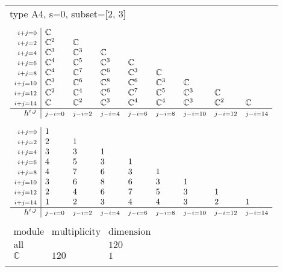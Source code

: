 \documentclass[crop,border=2mm]{standalone}
\begin{document}
\begin{tabular}{l}
{\huge type A4, s=0, subset=[2, 3]}\\ \\


$\displaystyle
\begin{array}{r|l l l l l l l l}
	{\scriptstyle i+j=0}&\mathbb{C}&&&&&&&\\
	{\scriptstyle i+j=2}&\mathbb{C}^{2}&\mathbb{C}&&&&&&\\
	{\scriptstyle i+j=4}&\mathbb{C}^{3}&\mathbb{C}^{3}&\mathbb{C}&&&&&\\
	{\scriptstyle i+j=6}&\mathbb{C}^{4}&\mathbb{C}^{5}&\mathbb{C}^{3}&\mathbb{C}&&&&\\
	{\scriptstyle i+j=8}&\mathbb{C}^{4}&\mathbb{C}^{7}&\mathbb{C}^{6}&\mathbb{C}^{3}&\mathbb{C}&&&\\
	{\scriptstyle i+j=10}&\mathbb{C}^{3}&\mathbb{C}^{6}&\mathbb{C}^{8}&\mathbb{C}^{6}&\mathbb{C}^{3}&\mathbb{C}&&\\
	{\scriptstyle i+j=12}&\mathbb{C}^{2}&\mathbb{C}^{4}&\mathbb{C}^{6}&\mathbb{C}^{7}&\mathbb{C}^{5}&\mathbb{C}^{3}&\mathbb{C}&\\
	{\scriptstyle i+j=14}&\mathbb{C}&\mathbb{C}^{2}&\mathbb{C}^{3}&\mathbb{C}^{4}&\mathbb{C}^{4}&\mathbb{C}^{3}&\mathbb{C}^{2}&\mathbb{C}\\
	\hline h^{i,j}&{\scriptstyle j-i=0}&{\scriptstyle j-i=2}&{\scriptstyle j-i=4}&{\scriptstyle j-i=6}&{\scriptstyle j-i=8}&{\scriptstyle j-i=10}&{\scriptstyle j-i=12}&{\scriptstyle j-i=14}
\end{array}
$ \\ \\


$\displaystyle
\begin{array}{r|l l l l l l l l}
	{\scriptstyle i+j=0}&1&&&&&&&\\
	{\scriptstyle i+j=2}&2&1&&&&&&\\
	{\scriptstyle i+j=4}&3&3&1&&&&&\\
	{\scriptstyle i+j=6}&4&5&3&1&&&&\\
	{\scriptstyle i+j=8}&4&7&6&3&1&&&\\
	{\scriptstyle i+j=10}&3&6&8&6&3&1&&\\
	{\scriptstyle i+j=12}&2&4&6&7&5&3&1&\\
	{\scriptstyle i+j=14}&1&2&3&4&4&3&2&1\\
	\hline h^{i,j}&{\scriptstyle j-i=0}&{\scriptstyle j-i=2}&{\scriptstyle j-i=4}&{\scriptstyle j-i=6}&{\scriptstyle j-i=8}&{\scriptstyle j-i=10}&{\scriptstyle j-i=12}&{\scriptstyle j-i=14}
\end{array}
$ \\ \\


$\displaystyle
\begin{array}{rll}
	\text{module}&\text{multiplicity}&\text{dimension} \\ \hline \text{all}&&120 \\
	\mathbb{C}&120&1
\end{array}
$ \\ \\

\end{tabular}
\end{document}
